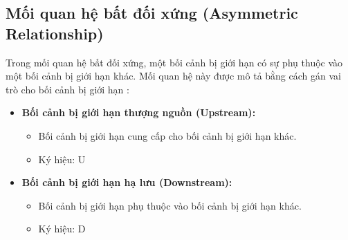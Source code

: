 
\subsection{Mối quan hệ bất đối xứng (Asymmetric Relationship)}


Trong mối quan hệ bất đối xứng, một bối cảnh bị giới hạn có sự phụ thuộc vào một bối cảnh bị giới hạn khác. Mối quan hệ này được mô tả bằng cách gán vai trò cho bối cảnh bị giới hạn :

\begin{itemize}

\item \textbf{Bối cảnh bị giới hạn thượng nguồn (Upstream):}

\begin{itemize}

\item Bối cảnh bị giới hạn cung cấp cho bối cảnh bị giới hạn khác.

\item Ký hiệu: U

\end{itemize}

\item \textbf{Bối cảnh bị giới hạn hạ lưu (Downstream):}

\begin{itemize}

\item Bối cảnh bị giới hạn phụ thuộc vào bối cảnh bị giới hạn khác.

\item Ký hiệu: D

\end{itemize}

\end{itemize}

